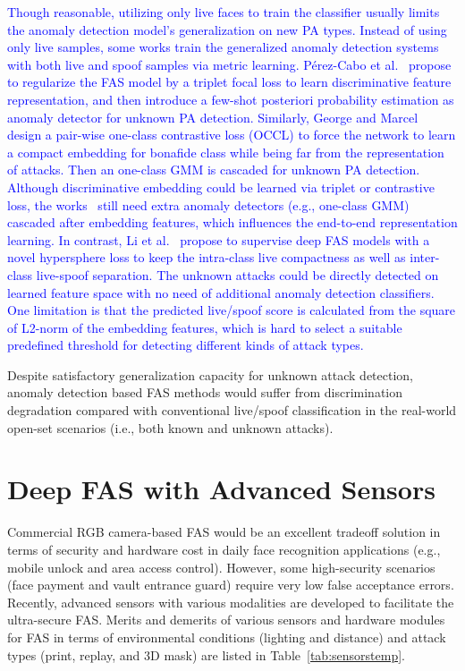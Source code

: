 \documentclass[10pt,journal,compsoc]{IEEEtran}
\begin{document}
\textcolor{blue}{Though reasonable, utilizing only live faces to train the classifier usually limits the anomaly detection model's generalization on new PA types. Instead of using only live samples, some works train the generalized anomaly detection systems with both live and spoof samples via metric learning. P{\'e}rez-Cabo et al.~\cite{perez2019deep} propose to regularize the FAS model by a triplet focal loss to learn discriminative feature representation, and then introduce a few-shot posteriori probability estimation as anomaly detector for unknown PA detection. Similarly, George and Marcel~\cite{george2020learning} design a pair-wise one-class contrastive loss (OCCL) to force the network to learn a compact embedding for bonafide class while being far from the representation of attacks. Then an one-class GMM is cascaded for unknown PA detection. Although discriminative embedding could be learned via triplet or contrastive loss, the works~\cite{perez2019deep,george2020learning} still need extra anomaly detectors (e.g., one-class GMM) cascaded after embedding features, which influences the end-to-end representation learning. In contrast, Li et al.~\cite{li2020unseen} propose to supervise deep FAS models with a novel hypersphere loss to keep the intra-class live compactness as well as inter-class live-spoof separation. The unknown attacks could be directly detected on learned feature space with no need of additional anomaly detection classifiers. One limitation is that the predicted live/spoof score is calculated from the square of L2-norm of the embedding features, which is hard to select a suitable predefined threshold for detecting different kinds of attack types.}


Despite satisfactory generalization capacity for unknown attack detection, anomaly detection based FAS methods would suffer from discrimination degradation compared with conventional live/spoof classification in the real-world open-set scenarios (i.e., both known and unknown attacks). 



\section{Deep FAS with Advanced Sensors} \label{sec:multimodal}

Commercial RGB camera-based FAS would be an excellent tradeoff solution in terms of security and hardware cost in daily face recognition applications (e.g., mobile unlock and area access control). However, some high-security scenarios (face payment and vault entrance guard) require very low false acceptance errors. Recently, advanced sensors with various modalities are developed to facilitate the ultra-secure FAS. Merits and demerits of various sensors and hardware modules for FAS in terms of environmental conditions (lighting and distance) and attack types (print, replay, and 3D mask) are listed in Table~\ref{tab:sensorstemp}. 
\end{document}
